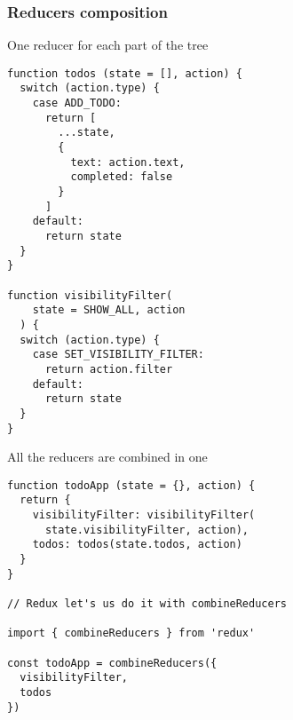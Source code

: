 \begin{frame}[fragile]
\frametitle{Reducers composition}

\begin{multicols}{2}
\scriptsize One reducer for each part of the tree
\begin{verbatim}
function todos (state = [], action) {
  switch (action.type) {
    case ADD_TODO:
      return [
        ...state,
        {
          text: action.text,
          completed: false
        }
      ]
    default:
      return state
  }
}

function visibilityFilter(
    state = SHOW_ALL, action
  ) {
  switch (action.type) {
    case SET_VISIBILITY_FILTER:
      return action.filter
    default:
      return state
  }
}
\end{verbatim}

\columnbreak

\scriptsize All the reducers are combined in one
\begin{verbatim}
function todoApp (state = {}, action) {
  return {
    visibilityFilter: visibilityFilter(
      state.visibilityFilter, action),
    todos: todos(state.todos, action)
  }
}

// Redux let's us do it with combineReducers

import { combineReducers } from 'redux'

const todoApp = combineReducers({
  visibilityFilter,
  todos
})

\end{verbatim}

\end{multicols}
\end{frame}
